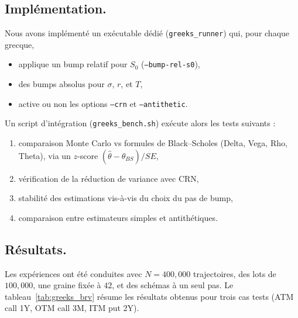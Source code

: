 \documentclass[a4paper,11pt]{article}
\begin{document}
\subsection*{Implémentation.}
Nous avons implémenté un exécutable dédié (\texttt{greeks\_runner}) qui, pour chaque grecque,
\begin{itemize}
  \item applique un bump relatif pour $S_0$ (\texttt{--bump-rel-s0}), 
  \item des bumps absolus pour $\sigma$, $r$, et $T$,
  \item active ou non les options \texttt{--crn} et \texttt{--antithetic}.
\end{itemize}
Un script d’intégration (\texttt{greeks\_bench.sh}) exécute alors les tests suivants :
\begin{enumerate}
  \item comparaison Monte Carlo vs formules de Black–Scholes (Delta, Vega, Rho, Theta), via un $z$-score $(\hat\theta - \theta_{BS})/SE$,
  \item vérification de la réduction de variance avec CRN,
  \item stabilité des estimations vis-à-vis du choix du pas de bump,
  \item comparaison entre estimateurs simples et antithétiques.
\end{enumerate}

\subsection*{Résultats.}
Les expériences ont été conduites avec $N=400{,}000$ trajectoires, 
des lots de $100{,}000$, une graine fixée à $42$, et des schémas à un seul pas.  
Le tableau~\ref{tab:greeks_brv} résume les résultats obtenus pour trois cas tests (ATM call 1Y, OTM call 3M, ITM put 2Y).  
\end{document}
